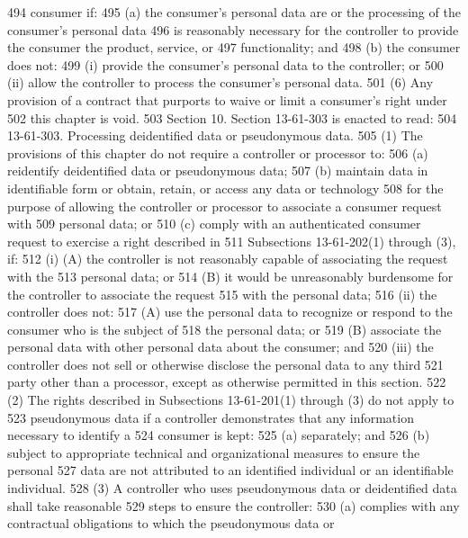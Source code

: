 494     consumer if:
495          (a) the consumer's personal data are or the processing of the consumer's personal data
496     is reasonably necessary for the controller to provide the consumer the product, service, or
497     functionality; and
498          (b) the consumer does not:
499          (i) provide the consumer's personal data to the controller; or
500          (ii) allow the controller to process the consumer's personal data.
501          (6) Any provision of a contract that purports to waive or limit a consumer's right under
502     this chapter is void.
503          Section 10. Section 13-61-303 is enacted to read:
504          13-61-303. Processing deidentified data or pseudonymous data.
505          (1) The provisions of this chapter do not require a controller or processor to:
506          (a) reidentify deidentified data or pseudonymous data;
507          (b) maintain data in identifiable form or obtain, retain, or access any data or technology
508     for the purpose of allowing the controller or processor to associate a consumer request with
509     personal data; or
510          (c) comply with an authenticated consumer request to exercise a right described in
511     Subsections 13-61-202(1) through (3), if:
512          (i) (A) the controller is not reasonably capable of associating the request with the
513     personal data; or
514          (B) it would be unreasonably burdensome for the controller to associate the request
515     with the personal data;
516          (ii) the controller does not:
517          (A) use the personal data to recognize or respond to the consumer who is the subject of
518     the personal data; or
519          (B) associate the personal data with other personal data about the consumer; and
520          (iii) the controller does not sell or otherwise disclose the personal data to any third
521     party other than a processor, except as otherwise permitted in this section.
522          (2) The rights described in Subsections 13-61-201(1) through (3) do not apply to
523     pseudonymous data if a controller demonstrates that any information necessary to identify a
524     consumer is kept:
525          (a) separately; and
526          (b) subject to appropriate technical and organizational measures to ensure the personal
527     data are not attributed to an identified individual or an identifiable individual.
528          (3) A controller who uses pseudonymous data or deidentified data shall take reasonable
529     steps to ensure the controller:
530          (a) complies with any contractual obligations to which the pseudonymous data or
